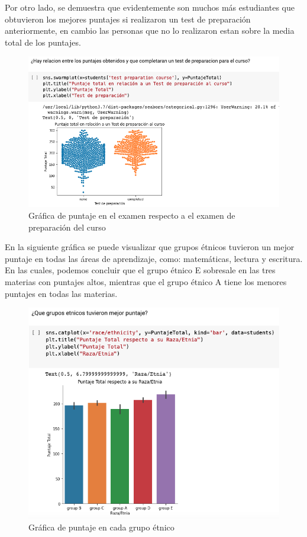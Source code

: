 \documentclass[conference,compsoc,onecolumn]{IEEEtran}
\begin{document}
        Por otro lado, se demuestra que evidentemente son muchos más estudiantes que obtuvieron los mejores puntajes si realizaron un test de preparación anteriormente, en cambio las personas que no lo realizaron estan sobre la media total de los puntajes.
         \begin{figure}[H]       
            \centering
            \includegraphics[scale = 0.50]{10.png}
            \caption{Gráfica de puntaje en el examen respecto a el examen de preparación del curso}
            \label{subfigura14}
        \end{figure}
        
         En la siguiente gráfica se puede visualizar que grupos étnicos tuvieron un mejor puntaje en todas las áreas de aprendizaje, como: matemáticas, lectura y escritura. En las cuales, podemos concluir que el grupo étnico E sobresale en las tres materias con puntajes altos, mientras que el grupo étnico A tiene los menores puntajes en todas las materias.
         \begin{figure}[H]       
            \centering
            \includegraphics[scale = 0.50]{11.png}
            \caption{Gráfica de puntaje en cada grupo étnico}
            \label{subfigura15}
        \end{figure}
        
\end{document}
